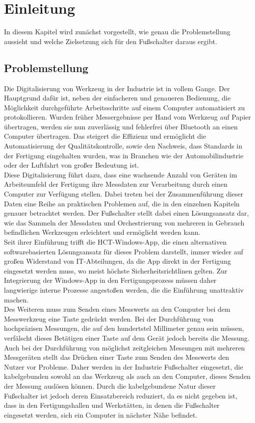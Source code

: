 \section{Einleitung}
In diesem Kapitel wird zunächst vorgestellt, wie genau die Problemstellung aussieht und welche Zielsetzung sich für den Fußschalter daraus ergibt.

\subsection{Problemstellung}
Die Digitalisierung von Werkzeug in der Industrie ist in vollem Gange. Der Hauptgrund dafür ist, neben der einfacheren und genaueren Bedienung, die Möglichkeit durchgeführte Arbeitsschritte auf einem Computer automatisiert zu protokollieren. Wurden früher Messergebnisse per Hand vom Werkzeug auf Papier übertragen, werden sie nun zuverlässig und fehlerfrei über Bluetooth an einen Computer übertragen. Das steigert die Effizienz und ermöglicht die Automatisierung der Qualitätskontrolle, sowie den Nachweis, dass Standards in der Fertigung eingehalten wurden, was in Branchen wie der Automobilindustrie oder der Luftfahrt von großer Bedeutung ist.\\
Diese Digitalisierung führt dazu, dass eine wachsende Anzahl von Geräten im Arbeitsumfeld der Fertigung ihre Messdaten zur Verarbeitung durch einen Computer zur Verfügung stellen. Dabei treten bei der Zusammenführung dieser Daten eine Reihe an praktischen Problemen auf, die in den einzelnen Kapiteln genauer betrachtet werden. Der Fußschalter stellt dabei einen Lösungsansatz dar, wie das Sammeln der Messdaten und Orchestrierung von mehreren in Gebrauch befindlichen Werkzeugen erleichtert und ermöglicht werden kann.\\
Seit ihrer Einführung trifft die \ac{HCT}-Windows-App, die einen alternativen softwarebasierten Lösungsansatz für dieses Problem darstellt, immer wieder auf großen Widerstand von IT-Abteilungen, da die App direkt in der Fertigung eingesetzt werden muss, wo meist höchste Sicherheitsrichtlinen gelten. Zur Integrierung der Windows-App in den Fertigungsprozess müssen daher langwierige interne Prozesse angestoßen werden, die die Einführung unattraktiv machen.\\
Des Weiteren muss zum Senden eines Messwerts an den Computer bei dem Messwerkzeug eine Taste gedrückt werden. Bei der Durchführung von hochpräzisen Messungen, die auf den hundertstel Millimeter genau sein müssen, verfälscht dieses Betätigen einer Taste auf dem Gerät jedoch bereits die Messung. Auch bei der Durchführung von möglichst zeitgleichen Messungen mit mehreren Messgeräten stellt das Drücken einer Taste zum Senden des Messwerts den Nutzer vor Probleme. Daher werden in der Industrie Fußschalter eingesetzt, die kabelgebunden sowohl an das Werkzeug als auch an den Computer, dieses Senden der Messung auslösen können. Durch die kabelgebundene Natur dieser Fußschalter ist jedoch deren Einsatzbereich reduziert, da es nicht gegeben ist, dass in den Fertigungshallen und Werkstätten, in denen die Fußschalter eingesetzt werden, sich ein Computer in nächster Nähe befindet. 

